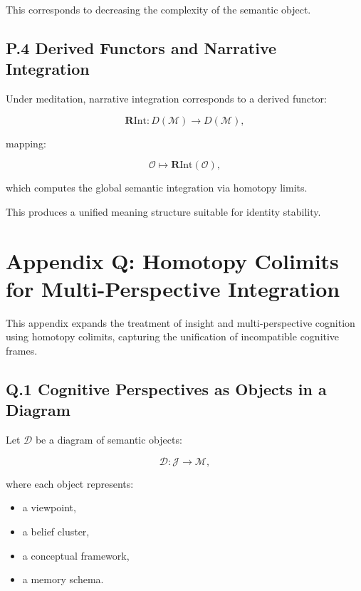 \documentclass[12pt]{article}
\begin{document}
This corresponds to decreasing the complexity of the semantic object.


\subsection*{P.4 Derived Functors and Narrative Integration}

Under meditation, narrative integration corresponds to a derived functor:

\[
\mathbf{R} \mathrm{Int} : D(\mathcal{M}) \to D(\mathcal{M}),
\]

mapping:

\[
\mathcal{O} \mapsto \mathbf{R}\mathrm{Int}(\mathcal{O}),
\]

which computes the global semantic integration via homotopy limits.

This produces a unified meaning structure suitable for identity stability.


\section*{Appendix Q: Homotopy Colimits for Multi-Perspective Integration}

This appendix expands the treatment of insight and multi-perspective cognition
using homotopy colimits, capturing the unification of incompatible cognitive
frames.

\subsection*{Q.1 Cognitive Perspectives as Objects in a Diagram}

Let $\mathcal{D}$ be a diagram of semantic objects:

\[
\mathcal{D} : \mathcal{J} \to \mathcal{M},
\]

where each object represents:

\begin{itemize}
    \item a viewpoint,
    \item a belief cluster,
    \item a conceptual framework,
    \item a memory schema.
\end{itemize}
\end{document}
